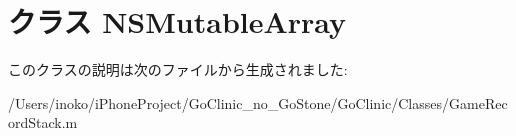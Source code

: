 \hypertarget{class_n_s_mutable_array}{
\section{クラス NSMutableArray}
\label{class_n_s_mutable_array}
}


このクラスの説明は次のファイルから生成されました:\begin{DoxyCompactItemize}
\item 
/Users/inoko/iPhoneProject/GoClinic\_\-no\_\-GoStone/GoClinic/Classes/GameRecordStack.m\end{DoxyCompactItemize}
